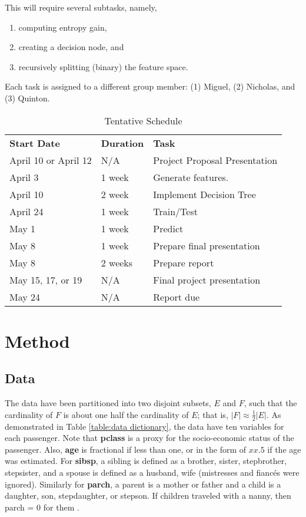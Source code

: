 \documentclass[12pt]{amsproc}
\theoremstyle{definition}
\begin{document}
	This will require several subtasks, namely,
	
	\begin{enumerate}
		\item computing entropy gain,
		\item creating a decision node, and
		\item recursively splitting (binary) the feature space. 
	\end{enumerate}
	
	Each task is assigned to a different group member: (1) Miguel, (2) Nicholas, and (3) Quinton. 


	\begin{table}[h!]
		\centering
		\caption{Tentative Schedule}
		\label{Tentative Schedule}
		\begin{tabular}{lll}
			\textbf{Start Date} & \textbf{Duration} & \textbf{Task} \\
			April 10 or April 12 & N/A & Project Proposal Presentation \\
			April 3 & 1 week & Generate features. \\
			April 10 & 2 week & Implement Decision Tree \\
			April 24 & 1 week & Train/Test \\
			May 1 & 1 week & Predict \\
			May 8 & 1 week & Prepare final presentation \\
			May 8 & 2 weeks & Prepare report \\
			May 15, 17, or 19 & N/A & Final project presentation \\
			May 24 & N/A & Report due
		\end{tabular}
	\end{table}
	
	
	\section{Method}\label{method}
	
	\subsection{Data}\label{method:data}
	The data have been partitioned into two disjoint subsets, $E$ and $F$, such that the cardinality of $F$ is about one half the cardinality of $E$; that is, $|F| \approx \frac{1}{2} |E|$. As demonstrated in Table \ref{table:data dictionary}, the data have ten variables for each passenger. Note that \textbf{pclass} is a proxy for the socio-economic status of the passenger. Also, \textbf{age} is fractional if less than one, or in the form of $xx.5$ if the age was estimated. For \textbf{sibsp}, a sibling is defined as a brother, sister, stepbrother, stepsister, and a spouse is defined as a husband, wife (mistresses and fianc\'{e}s were ignored). Similarly for \textbf{parch}, a parent is a mother or father and a child is a daughter, son, stepdaughter, or stepson. If children traveled with a nanny, then parch = 0 for them \cite{kaggle}.
	 
\end{document}
